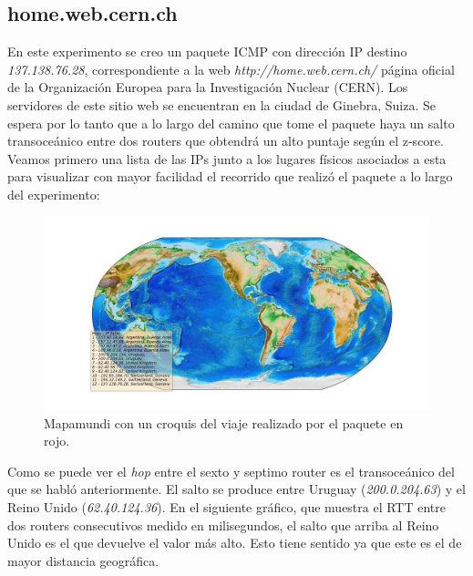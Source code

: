 \subsection{home.web.cern.ch}

En este experimento se creo un paquete ICMP con dirección IP destino \textit{137.138.76.28}, correspondiente a la web \textit{http://home.web.cern.ch/} página oficial de la Organización Europea para la Investigación Nuclear (CERN). Los servidores de este sitio web se encuentran en la ciudad de Ginebra, Suiza. Se espera por lo tanto que a lo largo del camino que tome el paquete haya un salto transoceánico entre dos routers que obtendrá un alto puntaje según el z-score. Veamos primero una lista de las IPs junto a los lugares físicos asociados a esta para visualizar con mayor facilidad el recorrido que realizó el paquete a lo largo del experimento:

\begin{figure}[H]
  \centering	
	\includegraphics[scale=0.3]{../cern-experiment/figure_1.jpeg}
  \caption{Mapamundi con un croquis del viaje realizado por el paquete en rojo.}
	\label{fig:histo-src-sitiotrabajo}
\end{figure}

Como se puede ver el \textit{hop} entre el sexto y septimo router es el transoceánico del que se habló anteriormente. El salto se produce entre Uruguay (\textit{200.0.204.63}) y el Reino Unido (\textit{62.40.124.36}). En el siguiente gráfico, que muestra el RTT entre dos routers consecutivos medido en milisegundos, el salto que arriba al Reino Unido es el que devuelve el valor más alto. Esto tiene sentido ya que este es el de mayor distancia geográfica.

